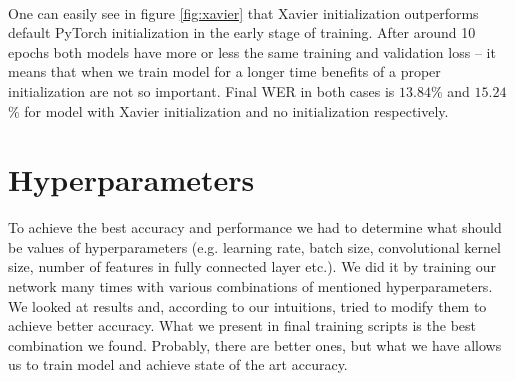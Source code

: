 \documentclass[licencjacka,en]{pracamgr}
\begin{document}
	\noindent%
	\begin{minipage}{\linewidth}%
		\label{fig:xavier}		     
	\end{minipage}\\
	
	
	One can easily see in figure \ref{fig:xavier} that Xavier initialization outperforms default PyTorch initialization in the early stage of training. After around 10 epochs both models have more or less the same training and validation loss -- it means that when we train model for a longer time benefits of a proper initialization are not so important. Final WER in both cases is $13.84$\% and $15.24$\% for model with Xavier initialization and no initialization respectively.
	
	
	
	\section{Hyperparameters}
	To achieve the best accuracy and performance we had to determine what should be values of hyperparameters (e.g. learning rate, batch size, convolutional kernel size, number of features in fully connected layer etc.). We did it by training our network many times with various combinations of mentioned hyperparameters. We looked at results and, according to our intuitions, tried to modify them to achieve better accuracy. What we present in final training scripts is the best combination we found. Probably, there are better ones, but what we have allows us to train model and achieve state of the art accuracy.
	
\end{document}
